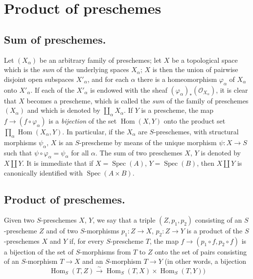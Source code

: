 \section{Product of preschemes}
\label{section:I.3}

\subsection{Sum of preschemes.}
\label{subsection:I.3.1}

Let $(X_\alpha)$ be an arbitrary family of preschemes; let $X$ be a topological
space which is the \emph{sum} of the underlying spaces $X_\alpha$; $X$ is then
the union of pairwise disjoint open subspaces $X'_\alpha$, and for
each $\alpha$ there is a homeomorphism $\varphi_\alpha$ of $X_\alpha$ onto
$X'_\alpha$. If each of the $X'_\alpha$ is endowed with the sheaf
$(\varphi_\alpha)_*(\mathscr{O}_{X_\alpha})$, it is clear that $X$ becomes a
prescheme, which is called the \emph{sum} of the family of preschemes $(X_\alpha)$
and which is denoted by $\coprod_\alpha X_\alpha$. If $Y$ is a prescheme,
the map $f\to(f\circ\varphi_\alpha)$ is a \emph{bijection} of
the set $\operatorname{Hom}(X,Y)$ onto the product set
$\prod_\alpha\operatorname{Hom}(X_\alpha,Y)$. In particular, if the
$X_\alpha$ are $S$-preschemes, with structural morphisms $\psi_\alpha$,
$X$ is an $S$-prescheme by means of the unique morphism $\psi:X\to S$ such that
$\psi\circ\varphi_\alpha=\psi_\alpha$ for all $\alpha$. The sum of two
preschemes $X$, $Y$ is denoted by $X\amalg Y$. It is immediate that if
$X=\operatorname{Spec}(A)$, $Y=\operatorname{Spec}(B)$, then $X\amalg Y$
is canonically identified with $\operatorname{Spec}(A\times B)$.

\subsection{Product of preschemes.}
\label{subsection:I.3.2}

\begin{definition}[3.2.1]
\label{I.3.2.1}
Given two $S$-preschemes $X$, $Y$, we say that a triple
$(Z,p_1,p_2)$ consisting of an $S$-prescheme $Z$ and of two $S$-morphisms
$p_1:Z\to X$, $p_2:Z\to Y$ is a product of the
$S$-preschemes $X$ and $Y$ if, for every $S$-prescheme $T$, the map
$f\to(p_1\circ f,p_2\circ f)$ is a bijection of the set of
$S$-morphisms from $T$ to $Z$ onto the set of pairs consisting of an
$S$-morphism $T\to X$ and an $S$-morphism $T\to Y$ (in other words, a
bijection
\[
  \operatorname{Hom}_S(T,Z)\xrightarrow{\sim}
  \operatorname{Hom}_S(T,X)\times\operatorname{Hom}_S(T,Y))
\]
\end{definition}

